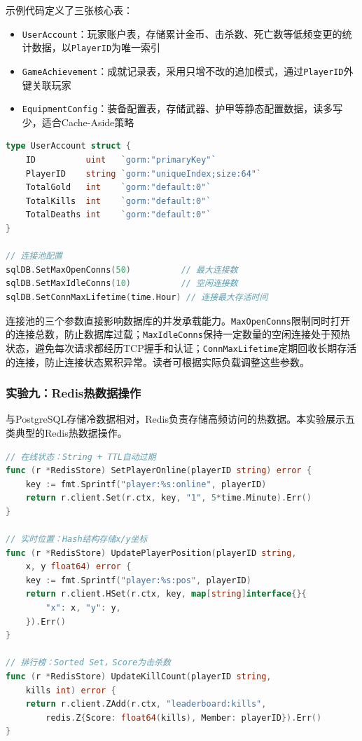 示例代码定义了三张核心表：
\begin{itemize}
\item \texttt{UserAccount}：玩家账户表，存储累计金币、击杀数、死亡数等低频变更的统计数据，以\texttt{PlayerID}为唯一索引
\item \texttt{GameAchievement}：成就记录表，采用只增不改的追加模式，通过\texttt{PlayerID}外键关联玩家
\item \texttt{EquipmentConfig}：装备配置表，存储武器、护甲等静态配置数据，读多写少，适合Cache-Aside策略
\end{itemize}

\begin{tcolorbox}[title=gorm模型与连接池配置]
\begin{lstlisting}[style=codeblock, language=go]
type UserAccount struct {
    ID          uint   `gorm:"primaryKey"`
    PlayerID    string `gorm:"uniqueIndex;size:64"`
    TotalGold   int    `gorm:"default:0"`
    TotalKills  int    `gorm:"default:0"`
    TotalDeaths int    `gorm:"default:0"`
}

// 连接池配置
sqlDB.SetMaxOpenConns(50)          // 最大连接数
sqlDB.SetMaxIdleConns(10)          // 空闲连接数
sqlDB.SetConnMaxLifetime(time.Hour) // 连接最大存活时间
\end{lstlisting}
\end{tcolorbox}

连接池的三个参数直接影响数据库的并发承载能力。\texttt{MaxOpenConns}限制同时打开的连接总数，防止数据库过载；\texttt{MaxIdleConns}保持一定数量的空闲连接处于预热状态，避免每次请求都经历TCP握手和认证；\texttt{ConnMaxLifetime}定期回收长期存活的连接，防止连接状态累积异常。读者可根据实际负载调整这些参数。

\subsubsection{实验九：Redis热数据操作}

与PostgreSQL存储冷数据相对，Redis负责存储高频访问的热数据。本实验展示五类典型的Redis热数据操作。

\begin{tcolorbox}[title=Redis热数据操作示例]
\begin{lstlisting}[style=codeblock, language=go]
// 在线状态：String + TTL自动过期
func (r *RedisStore) SetPlayerOnline(playerID string) error {
    key := fmt.Sprintf("player:%s:online", playerID)
    return r.client.Set(r.ctx, key, "1", 5*time.Minute).Err()
}

// 实时位置：Hash结构存储x/y坐标
func (r *RedisStore) UpdatePlayerPosition(playerID string,
    x, y float64) error {
    key := fmt.Sprintf("player:%s:pos", playerID)
    return r.client.HSet(r.ctx, key, map[string]interface{}{
        "x": x, "y": y,
    }).Err()
}

// 排行榜：Sorted Set，Score为击杀数
func (r *RedisStore) UpdateKillCount(playerID string,
    kills int) error {
    return r.client.ZAdd(r.ctx, "leaderboard:kills",
        redis.Z{Score: float64(kills), Member: playerID}).Err()
}
\end{lstlisting}
\end{tcolorbox}

